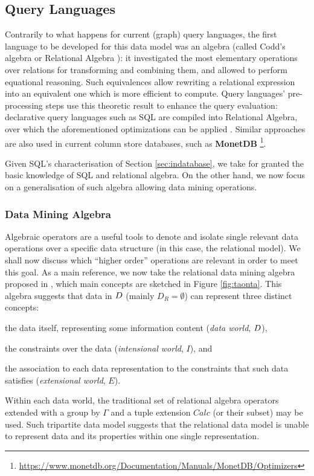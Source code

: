 \subsection{Query Languages}
Contrarily to what happens for current (graph) query languages, the first language to be developed for this data model was an algebra (called Codd's algebra or Relational Algebra \cite{atzeni,atzeniIT,Elmasri}): it investigated the most elementary operations over relations for transforming and combining them, and allowed to perform equational reasoning.  Such equivalences allow rewriting a relational expression into an equivalent one which is more efficient to compute. Query languages' pre-processing steps use this theoretic result to enhance the query evaluation: declarative query languages such as SQL are compiled into Relational Algebra, over which the aforementioned optimizations can be applied \cite{ceri1985}. Similar approaches are also used in current column store databases, such as \textbf{MonetDB} \footnote{\url{https://www.monetdb.org/Documentation/Manuals/MonetDB/Optimizers}}.

Given SQL's characterisation of Section \ref{sec:indatabase}, we take for granted the basic knowledge of SQL and relational algebra. On the other hand, we now focus on a generalisation of such algebra allowing data mining operations.

\subsubsection{Data Mining Algebra}\label{subsec:dmalgebra}
Algebraic operators are a useful tools to denote and isolate single relevant data operations over a specific data structure (in this case, the relational model).   We shall now discuss which ``higher order'' operations are relevant in order to meet this goal. As a main reference, we now take the relational data mining algebra proposed in \cite{Calders2006}, which main concepts are sketched in Figure \ref{fig:taonta}. This algebra suggests that data in $\data$ (mainly $D_R=\emptyset$) can represent three distinct concepts: \begin{mylist}
	\item the data itself, representing some information content (\textit{data world}, $\data$),
	\item the constraints over the data (\textit{intensional world}, $I$), and
	\item the association to each data representation to the constraints that such data satisfies (\textit{extensional world}, $E$).
\end{mylist}
Within each data world, the traditional set of relational algebra operators extended with a group by $\Gamma$ and a tuple extension $Calc$ (or their subset) may be used. Such tripartite data model suggests that the relational data model is unable to represent data and its properties within one single representation.



